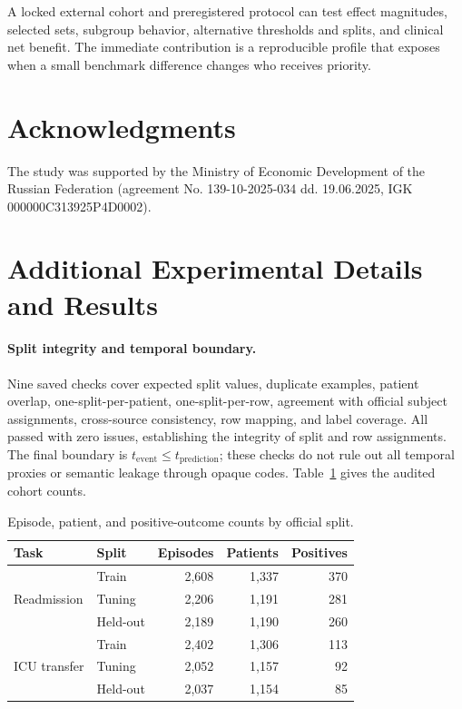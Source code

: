 \documentclass{article}
\begin{document}
A locked external cohort and preregistered protocol can test effect magnitudes,
selected sets, subgroup behavior, alternative thresholds and splits, and
clinical net benefit. The immediate contribution is a reproducible profile
that exposes when a small benchmark difference changes who receives priority.

\section*{Acknowledgments}
The study was supported by the Ministry of Economic Development of the Russian
Federation (agreement No. 139-10-2025-034 dd. 19.06.2025, IGK
000000C313925P4D0002).

\clearpage




\appendix

\section{Additional Experimental Details and Results}
\label{app:data_details}

\paragraph{Split integrity and temporal boundary.}
Nine saved checks cover expected split values, duplicate examples, patient
overlap, one-split-per-patient, one-split-per-row, agreement with official
subject assignments, cross-source consistency, row mapping, and label
coverage. All passed with zero issues, establishing the integrity of split and
row assignments. The final boundary is
$t_{\mathrm{event}}\leq t_{\mathrm{prediction}}$; these checks do not rule out
all temporal proxies or semantic leakage through opaque codes.
Table~\ref{tab:split_counts} gives the audited cohort counts.

\begin{table}[htbp]
  \caption{Episode, patient, and positive-outcome counts by official split.}
  \label{tab:split_counts}
  \centering
  \small
  \begin{tabular*}{\linewidth}{@{\extracolsep{\fill}}llrrr@{}}
    \toprule
    Task & Split & Episodes & Patients & Positives \\
    \midrule
    \multirow{3}{*}{Readmission}
      & Train & 2,608 & 1,337 & 370 \\
      & Tuning & 2,206 & 1,191 & 281 \\
      & Held-out & 2,189 & 1,190 & 260 \\
    \midrule
    \multirow{3}{*}{ICU transfer}
      & Train & 2,402 & 1,306 & 113 \\
      & Tuning & 2,052 & 1,157 & 92 \\
      & Held-out & 2,037 & 1,154 & 85 \\
    \bottomrule
  \end{tabular*}
\end{table}
\end{document}
